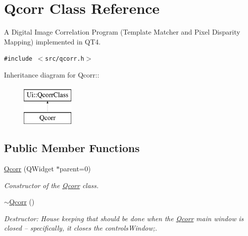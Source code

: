\hypertarget{classQcorr}{
\section{Qcorr Class Reference}
\label{classQcorr}
}
A Digital Image Correlation Program (Template Matcher and Pixel Disparity Mapping) implemented in QT4.  


{\tt \#include $<$src/qcorr.h$>$}

Inheritance diagram for Qcorr::\begin{figure}[H]
\begin{center}
\leavevmode
\includegraphics[height=2cm]{classQcorr}
\end{center}
\end{figure}
\subsection*{Public Member Functions}
\begin{CompactItemize}
\item 
\hypertarget{classQcorr_3b5d03aed21bfd00497ff265d898e45b}{
\hyperlink{classQcorr_3b5d03aed21bfd00497ff265d898e45b}{Qcorr} (QWidget $\ast$parent=0)}
\label{classQcorr_3b5d03aed21bfd00497ff265d898e45b}

\begin{CompactList}\small\item\em Constructor of the \hyperlink{classQcorr}{Qcorr} class. \item\end{CompactList}\item 
\hypertarget{classQcorr_c228e26878cd0b63b162f1680ab4f4fd}{
\hyperlink{classQcorr_c228e26878cd0b63b162f1680ab4f4fd}{$\sim$Qcorr} ()}
\label{classQcorr_c228e26878cd0b63b162f1680ab4f4fd}

\begin{CompactList}\small\item\em Destructor: House keeping that should be done when the \hyperlink{classQcorr}{Qcorr} main window is closed -- specifically, it closes the controlsWindow;. \item\end{CompactList}\end{CompactItemize}
